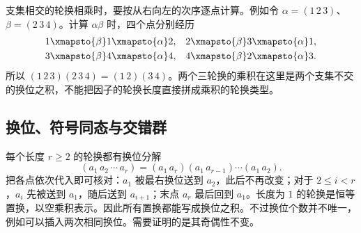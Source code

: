 \ProseParagraphBreak
支集相交的轮换相乘时，要按从右向左的次序逐点计算。例如令 \(\alpha=(1\,2\,3)\)、\(\beta=(2\,3\,4)\)。计算 \(\alpha\beta\) 时，四个点分别经历
\[
	\begin{aligned}
		1&\xmapsto{\beta}1\xmapsto{\alpha}2,& 2&\xmapsto{\beta}3\xmapsto{\alpha}1,\\
		3&\xmapsto{\beta}4\xmapsto{\alpha}4,& 4&\xmapsto{\beta}2\xmapsto{\alpha}3.
	\end{aligned}
\]
所以 \((1\,2\,3)(2\,3\,4)=(1\,2)(3\,4)\)。两个三轮换的乘积在这里是两个支集不交的换位之积，不能把因子的轮换长度直接拼成乘积的轮换类型。

\subsection{换位、符号同态与交错群}
\label{b1:subsec:0302:02}

每个长度 \(r\geq2\) 的轮换都有换位分解
\[
	(a_1\,a_2\,\cdots\,a_r) =(a_1\,a_r)(a_1\,a_{r-1})\cdots(a_1\,a_2).
\]
把各点依次代入即可核对：\(a_1\) 被最右换位送到 \(a_2\)，此后不再改变；对于 \(2\leq i<r\)，\(a_i\) 先被送到 \(a_1\)，随后送到 \(a_{i+1}\)；末点 \(a_r\) 最后回到 \(a_1\)。长度为 \(1\) 的轮换是恒等置换，以空乘积表示。因此所有置换都能写成换位之积。不过换位个数并不唯一，例如可以插入两次相同换位。需要证明的是其奇偶性不变。

